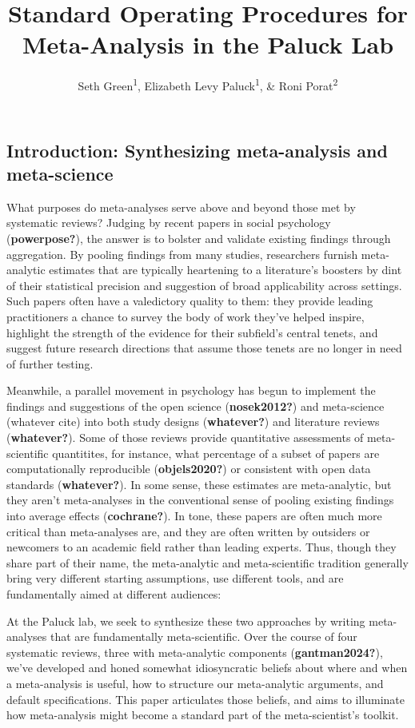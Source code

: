 \documentclass[
  man]{apa6}
\title{Standard Operating Procedures for Meta-Analysis in the Paluck Lab}
\author{Seth Green\textsuperscript{1}, Elizabeth Levy Paluck\textsuperscript{1}, \& Roni Porat\textsuperscript{2}}
\date{}
\affiliation{\vspace{0.5cm}\textsuperscript{1} Princeton University\\\textsuperscript{2} Hebrew University, Jerusalem}
\begin{document}
\maketitle

\subsection{Introduction: Synthesizing meta-analysis and meta-science}\label{introduction-synthesizing-meta-analysis-and-meta-science}

What purposes do meta-analyses serve above and beyond those met by systematic reviews? Judging by recent papers in social psychology (\textbf{powerpose?}), the answer is to bolster and validate existing findings through aggregation. By pooling findings from many studies, researchers furnish meta-analytic estimates that are typically heartening to a literature's boosters by dint of their statistical precision and suggestion of broad applicability across settings. Such papers often have a valedictory quality to them: they provide leading practitioners a chance to survey the body of work they've helped inspire, highlight the strength of the evidence for their subfield's central tenets, and suggest future research directions that assume those tenets are no longer in need of further testing.

Meanwhile, a parallel movement in psychology has begun to implement the findings and suggestions of the open science (\textbf{nosek2012?}) and meta-science (whatever cite) into both study designs (\textbf{whatever?}) and literature reviews (\textbf{whatever?}). Some of those reviews provide quantitative assessments of meta-scientific quantitites, for instance, what percentage of a subset of papers are computationally reproducible (\textbf{objels2020?}) or consistent with open data standards (\textbf{whatever?}). In some sense, these estimates are meta-analytic, but they aren't meta-analyses in the conventional sense of pooling existing findings into average effects (\textbf{cochrane?}). In tone, these papers are often much more critical than meta-analyses are, and they are often written by outsiders or newcomers to an academic field rather than leading experts. Thus, though they share part of their name, the meta-analytic and meta-scientific tradition generally bring very different starting assumptions, use different tools, and are fundamentally aimed at different audiences:

At the Paluck lab, we seek to synthesize these two approaches by writing meta-analyses that are fundamentally meta-scientific. Over the course of four systematic reviews, three with meta-analytic components (\textbf{gantman2024?}), we've developed and honed somewhat idiosyncratic beliefs about where and when a meta-analysis is useful, how to structure our meta-analytic arguments, and default specifications. This paper articulates those beliefs, and aims to illuminate how meta-analysis might become a standard part of the meta-scientist's toolkit.
\end{document}
